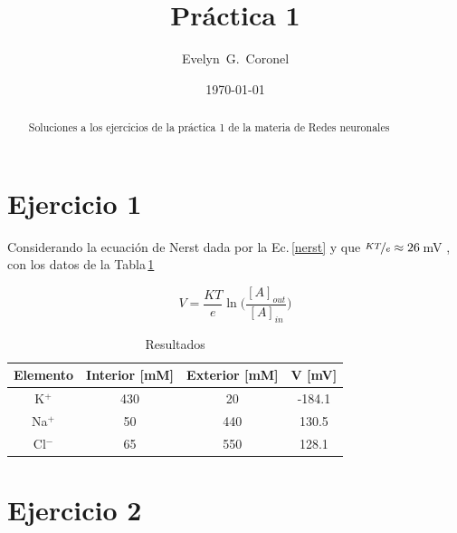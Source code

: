 



\title{Práctica 1}
\author{Evelyn~G.~Coronel}


\date[]{\lowercase{\today}} %

\begin{abstract}
Soluciones a los ejercicios de la práctica 1 de la materia de Redes neuronales
\end{abstract} 
\maketitle
%


\section{Ejercicio 1 }

Considerando la ecuación de Nerst dada por la Ec.\,\ref{nerst} y que $\nicefrac{KT}{e}\approx 26 $\,mV , con los datos de la Tabla\,\ref{table_ej1}

	\begin{equation}
		V = \frac{KT}{e} \ln\bigg(\frac{[A]_{out}}{[A]_{in}}\bigg)
		\label{nerst}
	\end{equation}

	\begin{table}[H]
	\centering
	\begin{tabular}{c|c|c|c}
	Elemento & Interior [mM] & Exterior [mM]& V [mV] \\ \hline
	K$^+$	 & 430			 & 20 			& -184.1 \\
	Na$^+$	 & 50 			 & 440			& 130.5 \\
	Cl$^-$	 & 65			 & 550			& 128.1 \\
	\end{tabular}
	\caption{Resultados} \label{table_ej1}
	\end{table}

\section{Ejercicio 2}

